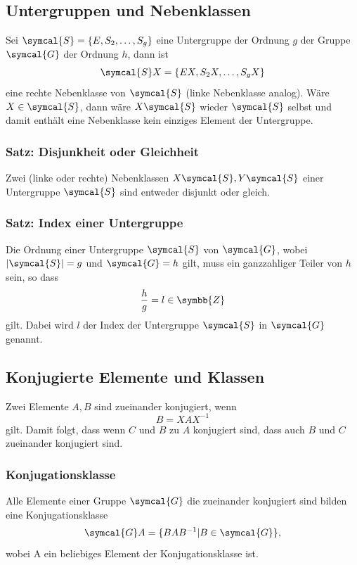 \documentclass[
  captions=tableheading,  %
  titlepage=firstiscover, %
]{scrartcl}
\begin{document}
\subsection{Untergruppen und Nebenklassen}
Sei $\symcal{S}  = \{E, S_2, \ldots, S_g \}$ eine Untergruppe der Ordnung $g$ der Gruppe $\symcal{G}$
der Ordnung $h$, dann ist 
\begin{equation*}
  \symcal{S}X = \{ EX, S_2X, \ldots, S_g X\}
\end{equation*}
eine rechte Nebenklasse von $\symcal{S}$ (linke Nebenklasse analog).
Wäre $X \in \symcal{S}$, dann wäre $X\symcal{S}$ wieder $\symcal{S}$ selbst und damit enthält
eine Nebenklasse kein einziges Element der Untergruppe.\\
\subsubsection{Satz: Disjunkheit oder Gleichheit}
Zwei (linke oder rechte) Nebenklassen $X\symcal{S}, Y\symcal{S}$ einer Untergruppe $\symcal{S}$ sind entweder 
disjunkt oder gleich.
\subsubsection{Satz: Index einer Untergruppe}
Die Ordnung einer Untergruppe $\symcal{S}$ von $\symcal{G}$, wobei 
$|\symcal{S}| = g$ und $\symcal{G} = h$ gilt, muss ein ganzzahliger Teiler von $h$ sein, so dass 
\begin{equation*}
  \frac{h}{g} = l \in \symbb{Z}
\end{equation*}
gilt.
Dabei wird $l$ der Index der Untergruppe $\symcal{S}$ in $\symcal{G}$ genannt.
\subsection{Konjugierte Elemente und Klassen}
Zwei Elemente $A, B$ sind zueinander konjugiert, wenn 
\begin{equation*}
  B = X A X^{-1}
\end{equation*}
gilt.
Damit folgt, dass wenn $C$ und $B$ zu $A$ konjugiert sind, dass auch $B$ und $C$ zueinander konjugiert sind.
\subsubsection{Konjugationsklasse}
Alle Elemente einer Gruppe $\symcal{G}$ die zueinander konjugiert sind bilden eine Konjugationsklasse
\begin{equation*}
  \symcal{G} A = \{BAB^{-1} | B \in \symcal{G} \},
\end{equation*}
wobei A ein beliebiges Element der Konjugationsklasse ist.
\end{document}

